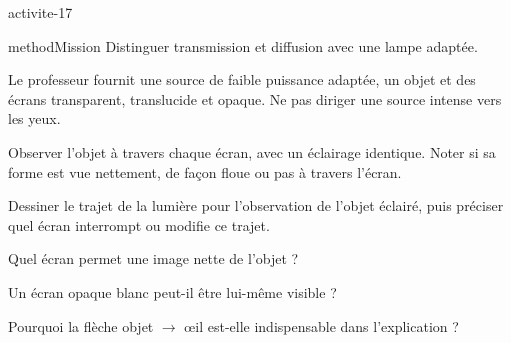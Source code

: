 \documentclass[12pt,twoside,openany]{book}
\begin{document}
\label{ch-17-activite}
\begin{pcFiche}{activite-17}
\begin{pcEncadre}{method}{Mission}
Distinguer transmission et diffusion avec une lampe adaptée.\par
\end{pcEncadre}
\begin{questions}
\item Le professeur fournit une source de faible puissance adaptée, un objet et des écrans transparent, translucide et opaque. Ne pas diriger une source intense vers les yeux.
\item Observer l’objet à travers chaque écran, avec un éclairage identique. Noter si sa forme est vue nettement, de façon floue ou pas à travers l’écran.
\item Dessiner le trajet de la lumière pour l’observation de l’objet éclairé, puis préciser quel écran interrompt ou modifie ce trajet.
\end{questions}
\begin{questions}
\item Quel écran permet une image nette de l’objet ?
\item Un écran opaque blanc peut-il être lui-même visible ?
\item Pourquoi la flèche objet \(\rightarrow\) œil est-elle indispensable dans l’explication ?
\end{questions}
\end{pcFiche}
\label{ch-17-bilan}
\end{document}
